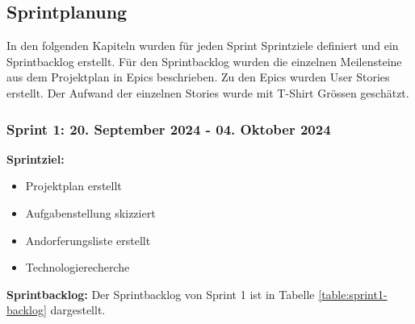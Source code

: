 \subsection{Sprintplanung}

In den folgenden Kapiteln wurden für jeden Sprint Sprintziele definiert und ein Sprintbacklog erstellt. Für den Sprintbacklog wurden die einzelnen Meilensteine aus dem Projektplan in Epics beschrieben. Zu den Epics wurden User Stories erstellt. Der Aufwand der einzelnen Stories wurde mit T-Shirt Grössen geschätzt.

\newpage
\subsubsection{Sprint 1: 20. September 2024 - 04. Oktober 2024}

\textbf{Sprintziel:}
\begin{itemize}
    \item Projektplan erstellt
    \item Aufgabenstellung skizziert
    \item Andorferungsliste erstellt
    \item Technologierecherche
\end{itemize}

\textbf{Sprintbacklog:} Der Sprintbacklog von Sprint 1 ist in Tabelle \ref{table:sprint1-backlog} dargestellt.

